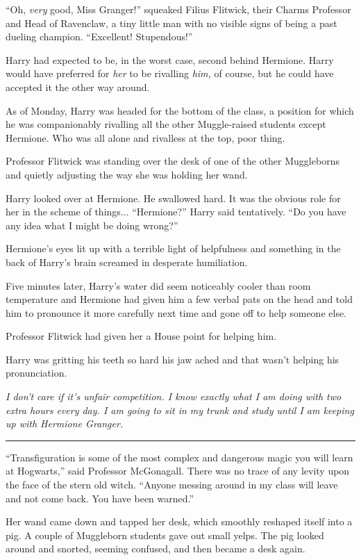``Oh, \emph{very} good, Miss Granger!'' squeaked Filius Flitwick, their Charms Professor and Head of Ravenclaw, a tiny little man with no visible signs of being a past dueling champion. ``Excellent! Stupendous!''

Harry had expected to be, in the worst case, second behind Hermione. Harry would have preferred for \emph{her} to be rivalling \emph{him,} of course, but he could have accepted it the other way around.

As of Monday, Harry was headed for the bottom of the class, a position for which he was companionably rivalling all the other Muggle-raised students except Hermione. Who was all alone and rivalless at the top, poor thing.

Professor Flitwick was standing over the desk of one of the other Muggleborns and quietly adjusting the way she was holding her wand.

Harry looked over at Hermione. He swallowed hard. It was the obvious role for her in the scheme of things... ``Hermione?'' Harry said tentatively. ``Do you have any idea what I might be doing wrong?''

Hermione's eyes lit up with a terrible light of helpfulness and something in the back of Harry's brain screamed in desperate humiliation.

Five minutes later, Harry's water did seem noticeably cooler than room temperature and Hermione had given him a few verbal pats on the head and told him to pronounce it more carefully next time and gone off to help someone else.

Professor Flitwick had given her a House point for helping him.

Harry was gritting his teeth so hard his jaw ached and that wasn't helping his pronunciation.

\emph{I don't care if it's unfair competition. I know exactly what I am doing with two extra hours every day. I am going to sit in my trunk and study until I am keeping up with Hermione Granger.}

\begin{center}\rule{3in}{0.4pt}\end{center}

``Transfiguration is some of the most complex and dangerous magic you will learn at Hogwarts,'' said Professor McGonagall. There was no trace of any levity upon the face of the stern old witch. ``Anyone messing around in my class will leave and not come back. You have been warned.''

Her wand came down and tapped her desk, which smoothly reshaped itself into a pig. A couple of Muggleborn students gave out small yelps. The pig looked around and snorted, seeming confused, and then became a desk again.

